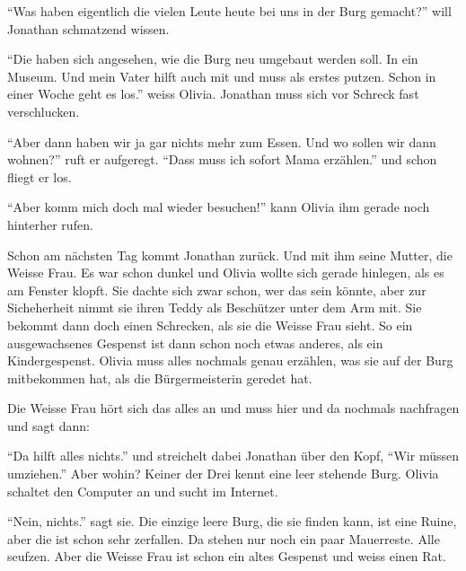 \enquote{Was haben eigentlich die vielen Leute heute bei uns in der Burg gemacht?} will Jonathan schmatzend wissen.

\enquote{Die haben sich angesehen, wie die Burg neu umgebaut werden soll. In ein Museum. Und mein Vater hilft auch mit und muss als erstes putzen. Schon in einer Woche geht es los.} weiss Olivia. Jonathan muss sich vor Schreck fast verschlucken.

\enquote{Aber dann haben wir ja gar nichts mehr zum Essen. Und wo sollen wir dann wohnen?} ruft er aufgeregt. \enquote{Dass muss ich sofort Mama erzählen.} und schon fliegt er los.

\enquote{Aber komm mich doch mal wieder besuchen!} kann Olivia ihm gerade noch hinterher rufen.

Schon am nächsten Tag kommt Jonathan zurück. Und mit ihm seine Mutter, die Weisse Frau. Es war schon dunkel und Olivia wollte sich gerade hinlegen, als es am Fenster klopft. Sie dachte sich zwar schon, wer das sein könnte, aber zur Sicheherheit nimmt sie ihren Teddy als Beschützer unter dem Arm mit. Sie bekommt dann doch einen Schrecken, als sie die Weisse Frau sieht. So ein ausgewachsenes Gespenst ist dann schon noch etwas anderes, als ein Kindergespenst. Olivia muss alles nochmals genau erzählen, was sie auf der Burg mitbekommen hat, als die Bürgermeisterin geredet hat.

Die Weisse Frau hört sich das alles an und muss hier und da nochmals nachfragen und sagt dann: 

\enquote{Da hilft alles nichts.} und streichelt dabei Jonathan über den Kopf, \enquote{Wir müssen umziehen.} Aber wohin? Keiner der Drei kennt eine leer stehende Burg. Olivia schaltet den Computer an und sucht im Internet.

\enquote{Nein, nichts.} sagt sie. Die einzige leere Burg, die sie finden kann, ist eine Ruine, aber die ist schon sehr zerfallen. Da stehen nur noch ein paar Mauerreste. Alle seufzen. Aber die Weisse Frau ist schon ein altes Gespenst und weiss einen Rat.


